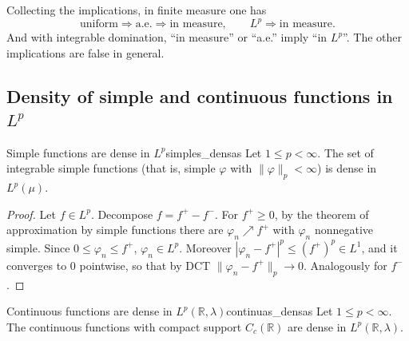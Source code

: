 \documentclass[11pt, a4paper]{article}
\begin{document}
\obs Collecting the implications, in finite measure one has
$$ \text{uniform} \Longrightarrow \text{a.e.} \Longrightarrow \text{in measure}, \qquad
L^p \Longrightarrow \text{in measure}. $$
And with integrable domination, ``in measure'' or ``a.e.'' imply ``in $L^p$''. The other
implications are false in general.

\subsection{Density of simple and continuous functions in \texorpdfstring{$L^p$}{Lp}}

\begin{teorema}{Simple functions are dense in $L^p$}{simples_densas}
Let $1 \le p < \infty$. The set of integrable simple functions (that is, simple $\varphi$
with $\|\varphi\|_p < \infty$) is dense in $L^p(\mu)$.
\end{teorema}

\begin{proof}
Let $f \in L^p$. Decompose $f = f^+ - f^-$. For $f^+ \ge 0$, by the theorem of approximation
by simple functions there are $\varphi_n \nearrow f^+$ with $\varphi_n$ nonnegative simple. Since
$0 \le \varphi_n \le f^+$, $\varphi_n \in L^p$. Moreover $|\varphi_n - f^+|^p \le (f^+)^p \in L^1$,
and it converges to 0 pointwise, so that by DCT $\|\varphi_n - f^+\|_p \to 0$. Analogously for $f^-$.
\end{proof}

\begin{teorema}{Continuous functions are dense in $L^p(\mathbb{R}, \lambda)$}{continuas_densas}
Let $1 \le p < \infty$. The continuous functions with compact support $C_c(\mathbb{R})$ are dense
in $L^p(\mathbb{R}, \lambda)$.
\end{teorema}
\end{document}
